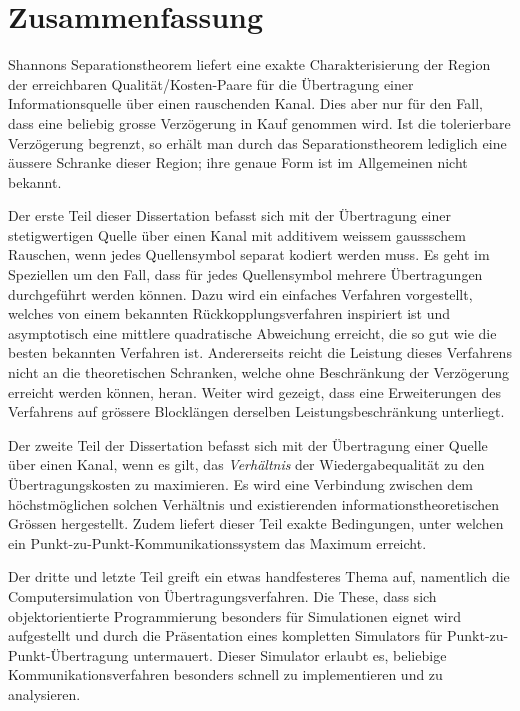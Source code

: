\chapter*{Zusammenfassung}

Shannons Separationstheorem liefert eine exakte Charakterisierung der Region
der erreichbaren Qualität/Kosten-Paare für die Übertragung einer
Informationsquelle über einen rauschenden Kanal. Dies aber nur für den Fall,
dass eine beliebig grosse Verzögerung in Kauf genommen wird. Ist die
tolerierbare Verzögerung begrenzt, so erhält man durch das Separationstheorem
lediglich eine äussere Schranke dieser Region; ihre genaue Form ist im
Allgemeinen nicht bekannt. 

Der erste Teil dieser Dissertation befasst sich mit der Übertragung einer
stetigwertigen Quelle über einen Kanal mit additivem weissem gaussschem
Rauschen, wenn jedes Quellensymbol separat kodiert werden muss. Es geht im
Speziellen um den Fall, dass für jedes Quellensymbol mehrere Übertragungen
durchgeführt werden können. Dazu wird ein einfaches Verfahren vorgestellt,
welches von einem bekannten Rückkopplungsverfahren inspiriert ist und
asymptotisch eine mittlere quadratische Abweichung erreicht, die so gut wie die
besten bekannten Verfahren ist. Andererseits reicht die Leistung dieses
Verfahrens nicht an die theoretischen Schranken, welche ohne Beschränkung der
Verzögerung erreicht werden können, heran. Weiter wird gezeigt, dass eine
Erweiterungen des Verfahrens auf grössere Blocklängen derselben
Leistungsbeschränkung unterliegt.

Der zweite Teil der Dissertation befasst sich mit der Übertragung einer Quelle
über einen Kanal, wenn es gilt, das \emph{Verhältnis} der Wiedergabequalität zu
den Übertragungskosten zu maximieren. Es wird eine Verbindung zwischen dem
höchstmöglichen solchen Verhältnis und existierenden informationstheoretischen
Grössen hergestellt. Zudem liefert dieser Teil exakte Bedingungen, unter welchen
ein Punkt-zu-Punkt-Kommunikationssystem das Maximum erreicht. 

Der dritte und letzte Teil greift ein etwas handfesteres Thema auf, namentlich
die Computersimulation von Übertragungsverfahren. Die These, dass sich
objektorientierte Programmierung besonders für Simulationen eignet wird
aufgestellt und durch die Präsentation eines kompletten Simulators für
Punkt-zu-Punkt-Übertragung untermauert. Dieser Simulator erlaubt es, beliebige
Kommunikationsverfahren besonders schnell zu implementieren und zu analysieren. 
